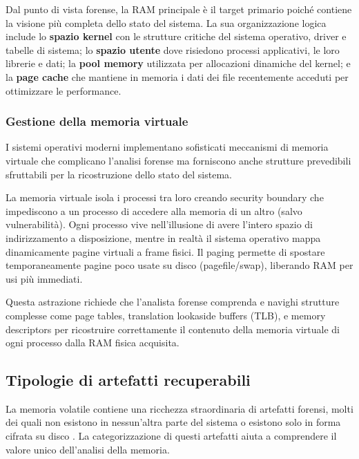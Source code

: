 Dal punto di vista forense, la RAM principale è il target primario poiché contiene la visione più completa dello stato del sistema. La sua organizzazione logica include lo \textbf{spazio kernel} con le strutture critiche del sistema operativo, driver e tabelle di sistema; lo \textbf{spazio utente} dove risiedono processi applicativi, le loro librerie e dati; la \textbf{pool memory} utilizzata per allocazioni dinamiche del kernel; e la \textbf{page cache} che mantiene in memoria i dati dei file recentemente acceduti per ottimizzare le performance.

\subsubsection{Gestione della memoria virtuale}
I sistemi operativi moderni implementano sofisticati meccanismi di memoria virtuale che complicano l'analisi forense ma forniscono anche strutture prevedibili sfruttabili per la ricostruzione dello stato del sistema.

La memoria virtuale isola i processi tra loro creando security boundary che impediscono a un processo di accedere alla memoria di un altro (salvo vulnerabilità). Ogni processo vive nell'illusione di avere l'intero spazio di indirizzamento a disposizione, mentre in realtà il sistema operativo mappa dinamicamente pagine virtuali a frame fisici. Il paging permette di spostare temporaneamente pagine poco usate su disco (pagefile/swap), liberando RAM per usi più immediati.

Questa astrazione richiede che l'analista forense comprenda e navighi strutture complesse come page tables, translation lookaside buffers (TLB), e memory descriptors per ricostruire correttamente il contenuto della memoria virtuale di ogni processo dalla RAM fisica acquisita.

\subsection{Tipologie di artefatti recuperabili}

La memoria volatile contiene una ricchezza straordinaria di artefatti forensi, molti dei quali non esistono in nessun'altra parte del sistema o esistono solo in forma cifrata su disco \cite{case2017}. La categorizzazione di questi artefatti aiuta a comprendere il valore unico dell'analisi della memoria.

